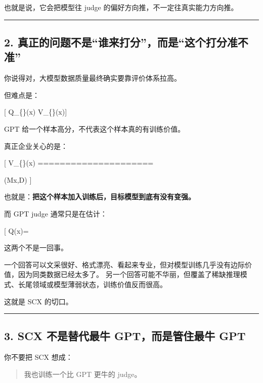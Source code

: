 \documentclass[
  12pt,
]{ctexart}
\begin{document}
也就是说，它会把模型往 judge 的偏好方向推，不一定往真实能力方向推。

\begin{center}\rule{0.5\linewidth}{0.5pt}\end{center}

\subsection{2.
真正的问题不是``谁来打分''，而是``这个打分准不准''}\label{ux771fux6b63ux7684ux95eeux9898ux4e0dux662fux8c01ux6765ux6253ux5206ux800cux662fux8fd9ux4e2aux6253ux5206ux51c6ux4e0dux51c6}

你说得对，大模型数据质量最终确实要靠评价体系拉高。

但难点是：

{[} Q\_\{\}(x) \neq V\_\{\}(x){]}

GPT 给一个样本高分，不代表这个样本真的有训练价值。

真正企业关心的是：

{[} V\_\{\}(x) =====================

\Delta {}(\mathcal M\mid x,\mathcal D) {]}

也就是：\textbf{把这个样本加入训练后，目标模型到底有没有变强。}

而 GPT judge 通常只是在估计：

{[} Q(x)=\text{这个样本看起来好不好}{]}

这两个不是一回事。

一个回答可以文采很好、格式漂亮、看起来专业，但对模型训练几乎没有边际价值，因为同类数据已经太多了。
另一个回答可能不华丽，但覆盖了稀缺推理模式、长尾领域或模型薄弱状态，训练价值反而很高。

这就是 SCX 的切口。

\begin{center}\rule{0.5\linewidth}{0.5pt}\end{center}

\subsection{3. SCX 不是替代最牛 GPT，而是管住最牛
GPT}\label{scx-ux4e0dux662fux66ffux4ee3ux6700ux725b-gptux800cux662fux7ba1ux4f4fux6700ux725b-gpt}

你不要把 SCX 想成：

\begin{quote}
我也训练一个比 GPT 更牛的 judge。
\end{quote}
\end{document}
